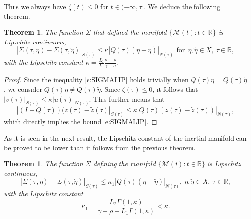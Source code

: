 \documentclass[a4paper,11pt,reqno]{amsart}
\theoremstyle{plain}
\newtheorem{thm}[lem]{Theorem}
\theoremstyle{definition}
\numberwithin{equation}{section}
\newcommand{\R}{\mathbb{R}}
\newcommand{\calm}{\mathcal M}
\renewcommand{\leq}{\leqslant}
\begin{document}
Thus we always have $\zeta(t)\leq 0$ for $t\in (-\infty,\tau]$. We deduce the following theorem.
\begin{thm}
	The function $\Sigma$ that defined the manifold $\{\calm(t)\colon t\in \R\}$ is Lipschitz continuous, 
		\begin{equation}\label{e:SIGMALIP}
			|\Sigma(\tau,\eta)-\Sigma(\tau,\tilde\eta)|_{S(\tau)}\leq\kappa|Q(\tau)(\eta-\tilde\eta)|_{N(\tau)}\ \ \text{for}\ \ \eta,\tilde\eta\in X,\ \tau\in\R,
		\end{equation}	
	with the Lipschitz constant $\kappa = \frac{L_2}{L_1}\frac{\sigma-\rho}{\gamma-\sigma}$.
\end{thm}
\begin{proof}
Since the inequality \eqref{e:SIGMALIP} holds trivially when $Q(\tau)\eta=Q(\tau)\tilde\eta$, we consider $Q(\tau)\eta\neq Q(\tau)\tilde\eta$. 	Since $\zeta(\tau) \leq 0$, it follows that $|v(\tau)|_{S(\tau)}\leq \kappa |u(\tau)|_{N(\tau)}$. This further means that 
	$$|(I-Q(\tau))(z(\tau)-\tilde z(\tau)|_{S(\tau)}\leq \kappa |Q(\tau)(z(\tau)-\tilde z(\tau))|_{N(\tau)},$$ 
which directly implies the bound \eqref{e:SIGMALIP}. 
\end{proof}
As it is seen in the next result, the Lipschitz constant of the inertial manifold can be proved to be lower than it follows from the previous theorem. 
\begin{thm}\label{thm:betterlip}
The function $\Sigma$ defining the manifold $\{ \calm(t)\colon t\in \R\}$ is Lipschitz continuous,
\begin{equation*}%
|\Sigma(\tau,\eta)-\Sigma(\tau,\tilde\eta)|_{S(\tau)}\leq\kappa_1|Q(\tau)(\eta-\tilde\eta)|_{N(\tau)},\ \eta,\tilde\eta\in X,\ \tau\in\R,
\end{equation*}
with the Lipschitz constant
\begin{equation*}%
\kappa_1=\frac{L_2\Gamma(1,\kappa)}{\gamma-\rho-L_1\Gamma(1,\kappa)}<\kappa.
\end{equation*}
\end{thm}
\end{document}
